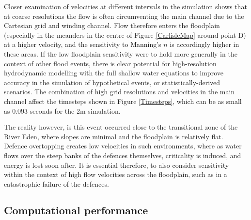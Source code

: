 Closer examination of velocities at different intervals in the simulation shows that at coarse resolutions the flow is often circumventing the main channel due to the Cartesian grid and winding channel. Flow therefore enters the floodplain (especially in the meanders in the centre of Figure \ref{CarlisleMap} around point D) at a higher velocity, and the sensitivity to Manning's \(n\) is accordingly higher in these areas. If the low floodplain sensitivity were to hold more generally in the context of other flood events, there is clear potential for high-resolution hydrodynamic modelling with the full shallow water equations to improve accuracy in the simulation of hypothetical events, or statistically-derived scenarios. The combination of high grid resolutions and velocities in the main channel affect the timesteps shown in Figure \ref{Timesteps}, which can be as small as 0.093 seconds for the 2m simulation.

The reality however, is this event occurred close to the transitional zone of the River Eden, where slopes are minimal and the floodplain is relatively flat. Defence overtopping creates low velocities in such environments, where as water flows over the steep banks of the defences themselves, criticality is induced, and energy is lost soon after. It is essential therefore, to also consider sensitivity within the context of high flow velocities across the floodplain, such as in a catastrophic failure of the defences.

\subsection{Computational performance}

\begin{table}[tpb]
\small
\centering
\caption{Simulation run-times for different devices, spatial resolutions and numerical precision (hh:mm:ss)}
\label{PerformanceResults}
\end{table}

